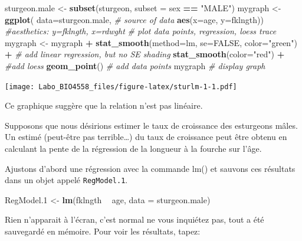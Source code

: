 \documentclass[12pt,]{book}
\newenvironment{Shaded}{\begin{snugshade}}{\end{snugshade}}
\newcommand{\CommentTok}[1]{\textcolor[rgb]{0.37,0.37,0.37}{\textit{#1}}}
\newcommand{\DataTypeTok}[1]{\textcolor[rgb]{0.27,0.27,0.27}{#1}}
\newcommand{\FloatTok}[1]{\textcolor[rgb]{0.06,0.06,0.06}{#1}}
\newcommand{\KeywordTok}[1]{\textcolor[rgb]{0.27,0.27,0.27}{\textbf{#1}}}
\newcommand{\NormalTok}[1]{#1}
\newcommand{\OperatorTok}[1]{\textcolor[rgb]{0.43,0.43,0.43}{\textbf{#1}}}
\newcommand{\OtherTok}[1]{\textcolor[rgb]{0.37,0.37,0.37}{#1}}
\newcommand{\StringTok}[1]{\textcolor[rgb]{0.5,0.5,0.5}{#1}}
\begin{document}
\begin{Shaded}
\begin{Highlighting}[]
\NormalTok{sturgeon.male <-}\StringTok{ }\KeywordTok{subset}\NormalTok{(sturgeon, }\DataTypeTok{subset =}\NormalTok{ sex }\OperatorTok{==}\StringTok{ "MALE"}\NormalTok{)}
\NormalTok{mygraph <-}\StringTok{ }\KeywordTok{ggplot}\NormalTok{(}
  \DataTypeTok{data=}\NormalTok{sturgeon.male, }\CommentTok{# source of data}
  \KeywordTok{aes}\NormalTok{(}\DataTypeTok{x=}\NormalTok{age, }\DataTypeTok{y=}\NormalTok{fklngth)) }\CommentTok{#aesthetics: y=fklngth, x=rdwght}
\CommentTok{# plot data points, regression, loess trace}
\NormalTok{mygraph <-}\StringTok{ }\NormalTok{mygraph }\OperatorTok{+}
\StringTok{  }\KeywordTok{stat_smooth}\NormalTok{(}\DataTypeTok{method=}\NormalTok{lm, }\DataTypeTok{se=}\OtherTok{FALSE}\NormalTok{, }\DataTypeTok{color=}\StringTok{"green"}\NormalTok{) }\OperatorTok{+}\StringTok{ }\CommentTok{# add linear regression, but no SE shading}
\StringTok{  }\KeywordTok{stat_smooth}\NormalTok{(}\DataTypeTok{color=}\StringTok{"red"}\NormalTok{) }\OperatorTok{+}\StringTok{ }\CommentTok{#add loess}
\StringTok{  }\KeywordTok{geom_point}\NormalTok{() }\CommentTok{# add data points}
\NormalTok{mygraph }\CommentTok{# display graph}
\end{Highlighting}
\end{Shaded}

\texttt{[image: Labo\_BIO4558\_files/figure-latex/sturlm-1-1.pdf]}

Ce graphique suggère que la relation n'est pas linéaire.

Supposons que nous désirions estimer le taux de croissance des esturgeons mâles.
Un estimé (peut-être pas terrible\ldots{}) du taux de croissance peut être obtenu en calculant la pente de la régression de la longueur à la fourche sur l'âge.

Ajustons d'abord une régression avec la commande lm() et sauvons ces résultats dans un objet appelé \texttt{RegModel.1}.

\begin{Shaded}
\begin{Highlighting}[]
\NormalTok{RegModel}\FloatTok{.1}\NormalTok{ <-}\StringTok{ }\KeywordTok{lm}\NormalTok{(fklngth }\OperatorTok{~}\StringTok{ }\NormalTok{age, }\DataTypeTok{data =}\NormalTok{ sturgeon.male)}
\end{Highlighting}
\end{Shaded}

Rien n'apparait à l'écran, c'est normal ne vous inquiétez pas, tout a été sauvegardé en mémoire.
Pour voir les résultats, tapez:
\end{document}
